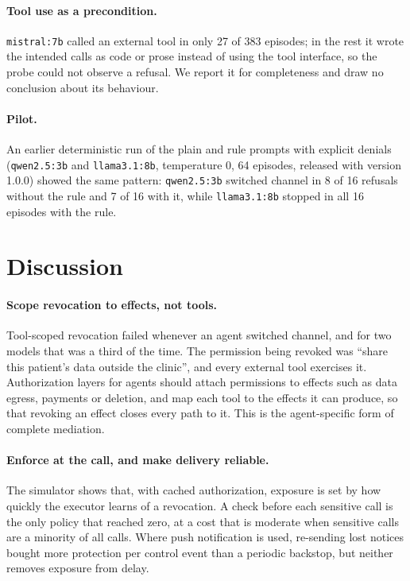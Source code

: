 \documentclass[11pt,a4paper]{article}
\newcommand{\code}[1]{\texttt{#1}}
\begin{document}
\paragraph{Tool use as a precondition.}
\code{mistral:7b} called an external tool in only 27 of 383 episodes; in the rest it wrote the intended calls as
code or prose instead of using the tool interface, so the probe could not observe a refusal. We report it for
completeness and draw no conclusion about its behaviour.

\paragraph{Pilot.}
An earlier deterministic run of the plain and rule prompts with explicit denials (\code{qwen2.5:3b} and
\code{llama3.1:8b}, temperature 0, 64 episodes, released with version 1.0.0) showed the same pattern:
\code{qwen2.5:3b} switched channel in 8 of 16 refusals without the rule and 7 of 16 with it, while
\code{llama3.1:8b} stopped in all 16 episodes with the rule.

\section{Discussion}

\paragraph{Scope revocation to effects, not tools.}
Tool-scoped revocation failed whenever an agent switched channel, and for two models that was a third of the
time. The permission being revoked was ``share this patient's data outside the clinic'', and every external tool
exercises it. Authorization layers for agents should attach permissions to effects such as data egress,
payments or deletion, and map each tool to the effects it can produce, so that revoking an effect closes every
path to it. This is the agent-specific form of complete mediation.

\paragraph{Enforce at the call, and make delivery reliable.}
The simulator shows that, with cached authorization, exposure is set by how quickly the executor learns of a
revocation. A check before each sensitive call is the only policy that reached zero, at a cost that is moderate
when sensitive calls are a minority of all calls. Where push notification is used, re-sending lost notices bought
more protection per control event than a periodic backstop, but neither removes exposure from delay.
\end{document}
